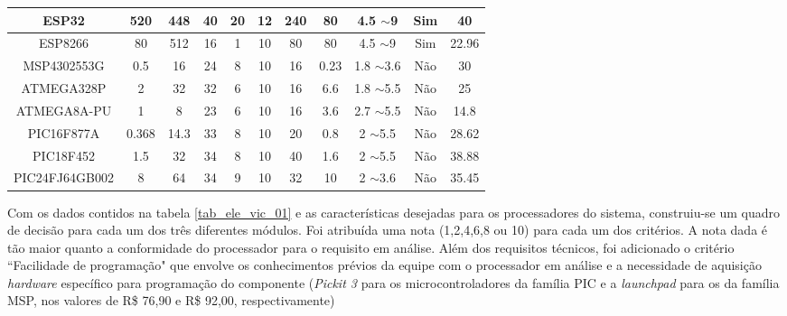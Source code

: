 \begin{table}[H]
\begin{miniscule}
\begin{tabular}{|c|c|c|c|c|c|c|c|c|c|c|}
			ESP32 & 520 & 448 & 40 & 20 & 12 & 240 & 80 & 4.5 $\sim$9 & Sim & 40 \\ \hline
			ESP8266 & 80 & 512 & 16 & 1 & 10 & 80 & 80 & 4.5 $\sim$9 & Sim & 22.96 \\ \hline
			MSP4302553G & 0.5 & 16 & 24 & 8 & 10 & 16 & 0.23 & 1.8 $\sim$3.6 & Não & 30 \\ \hline
			ATMEGA328P & 2 & 32 & 32 & 6 & 10 & 16 & 6.6 & 1.8 $\sim$5.5 & Não & 25 \\ \hline
			ATMEGA8A-PU & 1 & 8 & 23 & 6 & 10 & 16 & 3.6 & 2.7 $\sim$5.5 & Não & 14.8 \\ \hline
			PIC16F877A & 0.368 & 14.3 & 33 & 8 & 10 & 20 & 0.8 & 2 $\sim$5.5 & Não & 28.62 \\ \hline
			PIC18F452 & 1.5 & 32 & 34 & 8 & 10 & 40 & 1.6 & 2 $\sim$5.5 & Não & 38.88 \\ \hline
			PIC24FJ64GB002 & 8 & 64 & 34 & 9 & 10 & 32 & 10 & 2 $\sim$3.6 & Não & 35.45 \\ \hline
			\end{tabular}
		\end{miniscule}
	\end{table}

	Com os dados contidos na tabela \ref{tab_ele_vic_01} e as características desejadas para os processadores do sistema, construiu-se um quadro de decisão para cada um dos três diferentes módulos. Foi atribuída uma nota (1,2,4,6,8 ou 10) para cada um dos critérios. A nota dada é tão maior quanto a conformidade do processador para o requisito em análise. Além dos requisitos técnicos, foi adicionado o critério ``Facilidade de programação" que envolve os conhecimentos prévios da equipe com o processador em análise e a necessidade de aquisição \emph{hardware} específico para programação do componente (\emph{Pickit 3} para os microcontroladores da família PIC e a \emph{launchpad} para os da família MSP, nos valores de R\$ 76,90 e R\$ 92,00, respectivamente)


